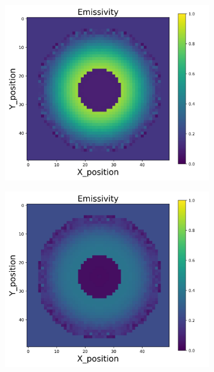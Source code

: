 {\begin{figure}[p]
\begin{minipage}{\textwidth}
\begin{subfigure}{0.325\textwidth}
        \end{subfigure}
        \begin{subfigure}{0.325\textwidth}
            \centering
            \includegraphics[width=\textwidth]{figures/raw_data/23/lin_square/emi_cal.jpg}
        \end{subfigure}
        \begin{subfigure}{0.325\textwidth}
            \centering
            \includegraphics[width=\textwidth]{figures/raw_data/24/lin_square/emi_cal.jpg}

\end{subfigure}
\end{minipage}
\end{figure}}
